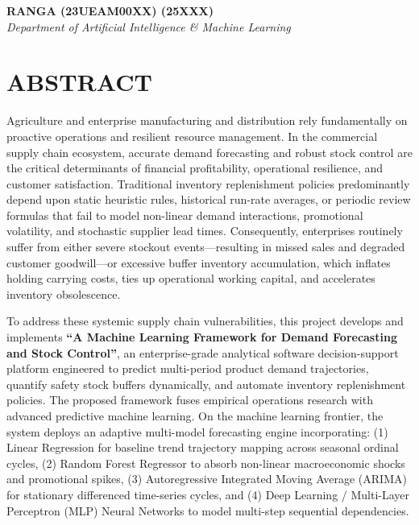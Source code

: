 \documentclass[12pt,a4paper]{report}
\begin{document}
\vspace{1.5cm}
\begin{flushright}
\textbf{RANGA (23UEAM00XX) (25XXX)}\\
\textit{Department of Artificial Intelligence \& Machine Learning}
\end{flushright}
\newpage

\chapter*{ABSTRACT}

\noindent Agriculture and enterprise manufacturing and distribution rely fundamentally on proactive operations and resilient resource management. In the commercial supply chain ecosystem, accurate demand forecasting and robust stock control are the critical determinants of financial profitability, operational resilience, and customer satisfaction. Traditional inventory replenishment policies predominantly depend upon static heuristic rules, historical run-rate averages, or periodic review formulas that fail to model non-linear demand interactions, promotional volatility, and stochastic supplier lead times. Consequently, enterprises routinely suffer from either severe stockout events---resulting in missed sales and degraded customer goodwill---or excessive buffer inventory accumulation, which inflates holding carrying costs, ties up operational working capital, and accelerates inventory obsolescence.

To address these systemic supply chain vulnerabilities, this project develops and implements \textbf{``A Machine Learning Framework for Demand Forecasting and Stock Control''}, an enterprise-grade analytical software decision-support platform engineered to predict multi-period product demand trajectories, quantify safety stock buffers dynamically, and automate inventory replenishment policies. The proposed framework fuses empirical operations research with advanced predictive machine learning. On the machine learning frontier, the system deploys an adaptive multi-model forecasting engine incorporating: (1) Linear Regression for baseline trend trajectory mapping across seasonal ordinal cycles, (2) Random Forest Regressor to absorb non-linear macroeconomic shocks and promotional spikes, (3) Autoregressive Integrated Moving Average (ARIMA) for stationary differenced time-series cycles, and (4) Deep Learning / Multi-Layer Perceptron (MLP) Neural Networks to model multi-step sequential dependencies.
\end{document}
